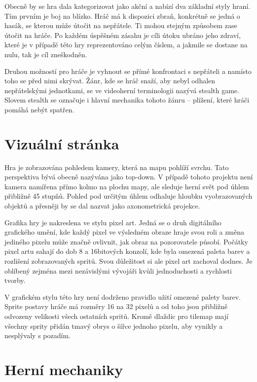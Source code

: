 \documentclass[FM,Proj]{tulthesis}
\begin{document}
	Obecně by se hra dala kategorizovat jako akční a nabízí dva základní styly hraní. Tím prvním je boj na blízko. Hráč má k dispozici zbraň, konkrétně se jedná o hasák, se kterou může útočit na nepřátele. Ti mohou stejným způsobem zase útočit na hráče. Po každém úspěšném zásahu je cíli útoku ubráno jeho zdraví, které je v případě této hry reprezentováno celým číslem, a jakmile se dostane na nulu, tak je cíl zneškodněn.
	
	Druhou možností pro hráče je vyhnout se přímé konfrontaci s nepřáteli a namísto toho se před nimi skrývat. Žánr, kde se hráč snaží, aby nebyl odhalen nepřátelskými jednotkami, se ve videoherní terminologii nazývá stealth game. Slovem stealth se označuje i hlavní mechanika tohoto žánru – plížení, které hráči pomáhá nebýt spatřen.
	
	\section{Vizuální stránka}
	
	Hra je zobrazována pohledem kamery, která na mapu pohlíží svrchu. Tato perspektiva bývá obecně nazývána jako top-down. V případě tohoto projektu není kamera namířena přímo kolmo na plochu mapy, ale sleduje herní svět pod úhlem přibližně 45 stupňů. Pohled pod určitým úhlem odhaluje hloubku vyobrazovaných objektů a přesněji by se dal nazvat jako axonometrická projekce.
	\cite{MatejJan}
	
	Grafika hry je nakreslena ve stylu pixel art. Jedná se o druh digitálního grafického umění, kde každý pixel ve výsledném obraze hraje svou roli a změna jediného pixelu může značně ovlivnit, jak obraz na pozorovatele působí. Počátky pixel artu sahají do dob 8 a 16bitových konzolí, kde byla omezená paleta barev a rozlišení zobrazovaných spritů. Svou důležitost si ale pixel art zachoval dodnes. Je oblíbený zejména mezi nezávislými vývojáři kvůli jednoduchosti a rychlosti tvorby.
	\cite{pixelArt}
	
	V grafickém stylu této hry není dodrženo pravidlo užití omezené palety barev. Sprite postavy hráče má rozměry 16 na 32 pixelů a od toho jsou přibližně odvozeny velikosti všech ostatních spritů. Kromě dlaždic pro tilemap mají všechny sprity přidán tmavý obrys o šířce jednoho pixelu, aby vynikly a nesplývaly s pozadím.
	
	\section{Herní mechaniky}
	
\end{document}
